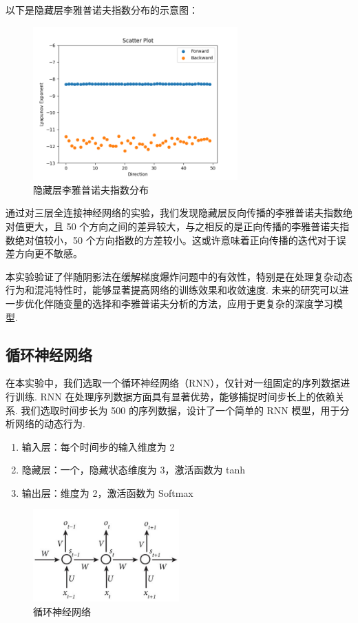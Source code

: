 以下是隐藏层李雅普诺夫指数分布的示意图：

\begin{figure}[htbp]
   \centering
   \includegraphics[width=0.7\textwidth]{figures/nn_lyapunov_exponents.png}
   \caption{隐藏层李雅普诺夫指数分布}
   \label{fig:example}
 \end{figure}

通过对三层全连接神经网络的实验，我们发现隐藏层反向传播的李雅普诺夫指数绝对值更大，且 50 个方向之间的差异较大，与之相反的是正向传播的李雅普诺夫指数绝对值较小，50 个方向指数的方差较小。这或许意味着正向传播的迭代对于误差方向更不敏感。

本实验验证了伴随阴影法在缓解梯度爆炸问题中的有效性，特别是在处理复杂动态行为和混沌特性时，能够显著提高网络的训练效果和收敛速度. 未来的研究可以进一步优化伴随变量的选择和李雅普诺夫分析的方法，应用于更复杂的深度学习模型. 

\subsection{循环神经网络}

在本实验中，我们选取一个循环神经网络（RNN），仅针对一组固定的序列数据进行训练. RNN 在处理序列数据方面具有显著优势，能够捕捉时间步长上的依赖关系. 我们选取时间步长为 500 的序列数据，设计了一个简单的 RNN 模型，用于分析网络的动态行为. 

\begin{enumerate}
   \item 输入层：每个时间步的输入维度为 2
   \item 隐藏层：一个，隐藏状态维度为 3，激活函数为 tanh
   \item 输出层：维度为 2，激活函数为 Softmax
\end{enumerate}

\begin{figure}[htbp]
   \centering
   \includegraphics[width=0.5\textwidth]{figures/rnn.jpeg}
   \caption{循环神经网络}
   \label{fig:example}
 \end{figure}

